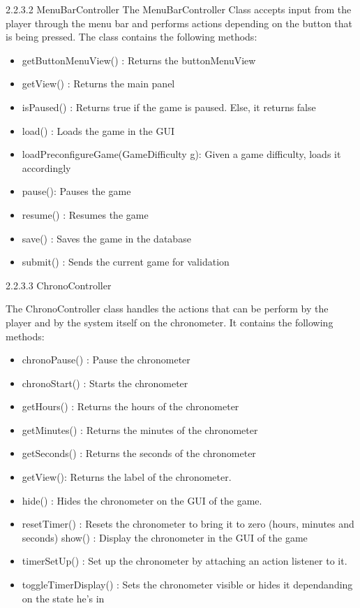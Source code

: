 \documentclass[12pt]{article}
\begin{document}
2.2.3.2 MenuBarController\newline
\newline The MenuBarController Class accepts input from the player through the menu bar and performs actions depending on the button that is being pressed. The class contains the following methods:\newline
\begin{itemize}
\item getButtonMenuView() : Returns the buttonMenuView
\item getView() : Returns the main panel
\item isPaused() : Returns true if the game is paused. Else, it returns false
\item load() : Loads the game in the GUI
\item loadPreconfigureGame(GameDifficulty g): Given a game difficulty, loads it accordingly
\item pause(): Pauses the game
\item resume() : Resumes the game
\item save() : Saves the game in the database
\item submit() : Sends the current game for validation\newline
\end{itemize}



2.2.3.3 ChronoController\newline

The ChronoController class handles the actions that can be perform by the player and by the system itself on the chronometer. It contains the following methods: \newline
\begin{itemize}
\item chronoPause() : Pause the chronometer
\item chronoStart() : Starts the chronometer
\item getHours() : Returns the hours of the chronometer
\item getMinutes() : Returns the minutes of the chronometer
\item getSeconds() : Returns the seconds of the chronometer
\item getView():  Returns the label of the chronometer.
\item hide() : Hides the chronometer on the GUI of the game.
\item resetTimer() : Resets the chronometer to bring it to zero (hours, minutes and seconds)
show() : Display the chronometer in the GUI of the game
\item timerSetUp() : Set up the chronometer by attaching an action listener to it.
\item toggleTimerDisplay() : Sets the chronometer visible or hides it dependanding on the state he’s in\newline
\end{itemize}
\end{document}

